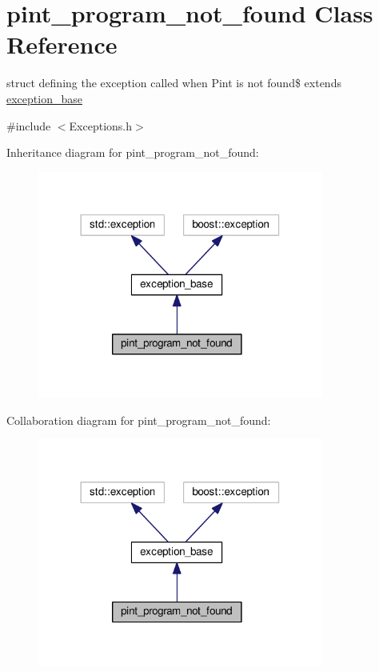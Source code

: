 \hypertarget{structpint__program__not__found}{\section{pint\+\_\+program\+\_\+not\+\_\+found Class Reference}
\label{structpint__program__not__found}
}


struct defining the exception called when Pint is not found\$ extends \hyperlink{structexception__base}{exception\+\_\+base}  




{\ttfamily \#include $<$Exceptions.\+h$>$}



Inheritance diagram for pint\+\_\+program\+\_\+not\+\_\+found\+:\nopagebreak
\begin{figure}[H]
\begin{center}
\leavevmode
\includegraphics[width=266pt]{structpint__program__not__found__inherit__graph}
\end{center}
\end{figure}


Collaboration diagram for pint\+\_\+program\+\_\+not\+\_\+found\+:\nopagebreak
\begin{figure}[H]
\begin{center}
\leavevmode
\includegraphics[width=266pt]{structpint__program__not__found__coll__graph}
\end{center}
\end{figure}


